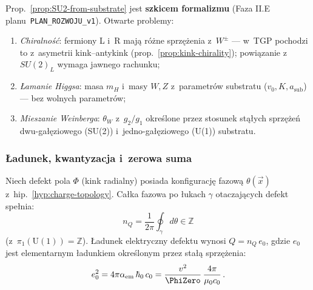 \begin{remark}%
\label{rem:SU2-status}
Prop.~\ref{prop:SU2-from-substrate} jest \textbf{szkicem formalizmu}
(Faza II.E planu~\texttt{PLAN\_ROZWOJU\_v1}).
Otwarte problemy:
\begin{enumerate}[nosep]
  \item \emph{Chiralność}: fermiony L i~R mają r\'o\.zne sprz\k{e}\.zenia
    z~$W^\pm$ --- w~TGP pochodzi to z~asymetrii kink--antykink
    (prop.~\ref{prop:kink-chirality}); powi\k{a}zanie z~$SU(2)_L$
    wymaga jawnego rachunku;
  \item \emph{\L{}amanie Higgsa}: masa $m_H$ i~masy $W, Z$ z~parametr\'ow
    substratu ($v_0, K, a_{\mathrm{sub}}$) --- bez wolnych parametr\'ow;
  \item \emph{Mieszanie Weinberga}: $\theta_W$ z~$g_2/g_1$ okre\'slone
    przez stosunek st\k{a}\l{}ych sprz\k{e}\.ze\'n
    dwu-ga\l{}\k{e}ziowego (SU(2)) i~jedno-ga\l{}\k{e}ziowego (U(1)) substratu.
\end{enumerate}
\end{remark}

\subsubsection{\L{}adunek, kwantyzacja i~zerowa suma}

\begin{proposition}\label{prop:charge-quantization}
Niech defekt pola $\Phi$ (kink radialny) posiada
konfiguracj\k{e} fazow\k{a} $\theta(\vec{x})$
z~hip.~\ref{hyp:charge-topology}. Ca\l{}ka fazowa
po \l{}ukach $\gamma$ otaczaj\k{a}cych defekt spe\l{}nia:
\begin{equation}\label{eq:charge-winding}
  n_Q = \frac{1}{2\pi}\oint_\gamma d\theta
  \in \mathbb{Z}
\end{equation}
(z~$\pi_1(\mathrm{U}(1)) = \mathbb{Z}$).
\L{}adunek elektryczny defektu wynosi $Q = n_Q\,e_0$,
gdzie $e_0$ jest elementarnym \l{}adunkiem okre\'slonym
przez sta\l{}\k{a} sprz\k{e}\.zenia:
\begin{equation}\label{eq:e0-from-substrate}
  e_0^2 = 4\pi\alpha_{\mathrm{em}}\,\hbar_0\,c_0
  = \frac{v^2}{\PhiZero}\,\frac{4\pi}{\mu_0 c_0}\,.
\end{equation}
\end{proposition}

